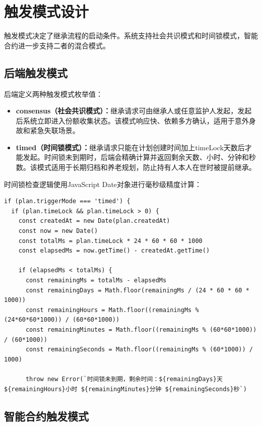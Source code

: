 \documentclass[UTF8,a4paper,zihao=-4,openany]{ctexrep}
\begin{document}
\section{触发模式设计}

触发模式决定了继承流程的启动条件。系统支持社会共识模式和时间锁模式，智能合约进一步支持二者的混合模式。

\subsection{后端触发模式}

后端定义两种触发模式枚举值：

\begin{itemize}
  \item \textbf{consensus（社会共识模式）：}继承请求可由继承人或任意监护人发起，发起后系统立即进入份额收集状态。该模式响应快、依赖多方确认，适用于意外身故和紧急失联场景。
  \item \textbf{timed（时间锁模式）：}继承请求只能在计划创建时间加上timeLock天数后才能发起。时间锁未到期时，后端会精确计算并返回剩余天数、小时、分钟和秒数。该模式适用于长期归档和养老规划，防止持有人本人在世时被提前继承。
\end{itemize}

时间锁检查逻辑使用JavaScript Date对象进行毫秒级精度计算：

\begin{lstlisting}[caption={时间锁检查 (legacyPlanService.ts:312-335, 节选)}]
if (plan.triggerMode === 'timed') {
  if (plan.timeLock && plan.timeLock > 0) {
    const createdAt = new Date(plan.createdAt)
    const now = new Date()
    const totalMs = plan.timeLock * 24 * 60 * 60 * 1000
    const elapsedMs = now.getTime() - createdAt.getTime()

    if (elapsedMs < totalMs) {
      const remainingMs = totalMs - elapsedMs
      const remainingDays = Math.floor(remainingMs / (24 * 60 * 60 * 1000))
      const remainingHours = Math.floor((remainingMs % (24*60*60*1000)) / (60*60*1000))
      const remainingMinutes = Math.floor((remainingMs % (60*60*1000)) / (60*1000))
      const remainingSeconds = Math.floor((remainingMs % (60*1000)) / 1000)

      throw new Error(`时间锁未到期，剩余时间：${remainingDays}天 ${remainingHours}小时 ${remainingMinutes}分钟 ${remainingSeconds}秒`)
\end{lstlisting}

\subsection{智能合约触发模式}
\end{document}
